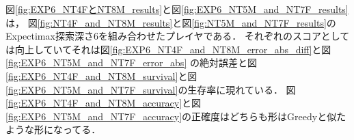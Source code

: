 図\ref{fig:EXP6_NT4FとNT8M_results}と図\ref{fig:EXP6_NT5M_and_NT7F_results}は，
図\ref{fig:NT4F_and_NT8M_results}と図\ref{fig:NT5M_and_NT7F_results}のExpectimax探索深さ6を組み合わせたプレイヤである．
それぞれのスコアとしては向上していてそれは図\ref{fig:EXP6_NT4F_and_NT8M_error_abs_diff}と図\ref{fig:EXP6_NT5M_and_NT7F_error_abs}
の絶対誤差と図\ref{fig:EXP6_NT4F_and_NT8M_survival}と図\ref{fig:EXP6_NT5M_and_NT7F_survival}の生存率に現れている．
図\ref{fig:EXP6_NT4F_and_NT8M_accuracy}と図\ref{fig:EXP6_NT5M_and_NT7F_accuracy}の正確度はどちらも形はGreedyと似たような形になってる．